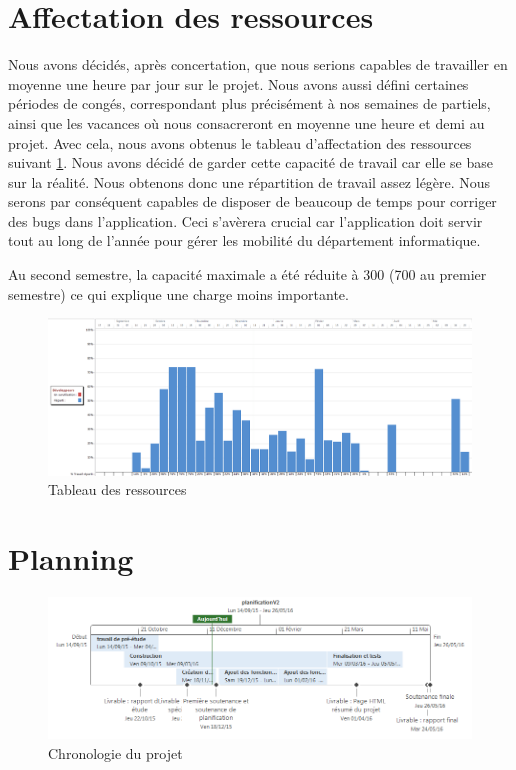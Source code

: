 \section{Affectation des ressources}
Nous avons décidés, après concertation, que nous serions capables de travailler en moyenne une heure par jour sur le projet. Nous avons aussi défini certaines périodes de congés, correspondant plus précisément à nos semaines de partiels, ainsi que les vacances où nous consacreront en moyenne une heure et demi au projet. Avec cela, nous avons obtenus le tableau d'affectation des ressources suivant \ref{fig::ressources}. Nous avons décidé de garder cette capacité de travail car elle se base sur la réalité. Nous obtenons donc une répartition de travail assez légère. Nous serons par conséquent capables de disposer de beaucoup de temps pour corriger des bugs dans l'application. Ceci s'avèrera crucial car l'application doit servir tout au long de l'année pour gérer les mobilité du département informatique.

Au second semestre, la capacité maximale a été réduite à 300  (700 au premier semestre) ce qui explique une charge moins importante.

\begin{figure}[H]
	\centering
	\includegraphics[angle=90,scale=0.35]{images/ressources.PNG}
	\caption{Tableau des ressources}
	\label{fig::ressources}
\end{figure}

\section{Planning}
\begin{figure}[H]
	\centering
	\includegraphics[scale=0.7]{images/chrono_planif.png}
	\caption{Chronologie du projet}
	\label{fig::chrono}
\end{figure}

